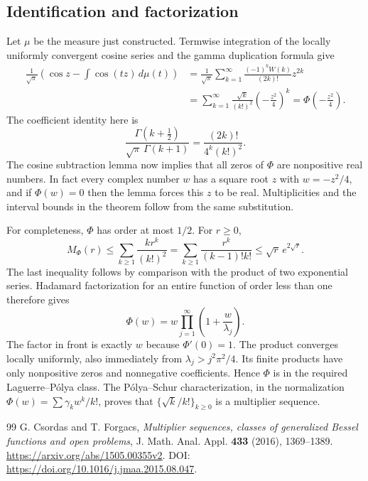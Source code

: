 \documentclass[11pt,a4paper]{article}
\theoremstyle{remark}
\begin{document}
\subsection{Identification and factorization}

Let $\mu$ be the measure just constructed.  Termwise integration of the
locally uniformly convergent cosine series and the gamma duplication
formula give
\begin{align*}
 \frac1{\sqrt\pi}
 \left(\cos z-\int\cos(tz)\,d\mu(t)\right)
 &=\frac1{\sqrt\pi}\sum_{k=1}^\infty
            \frac{(-1)^kW(k)}{(2k)!}z^{2k}\\
 &=\sum_{k=1}^\infty\frac{\sqrt{k}}{(k!)^2}
                         \left(-\frac{z^2}{4}\right)^k
 =\Phi\left(-\frac{z^2}{4}\right).
\end{align*}
The coefficient identity here is
\[
 \frac{\Gamma(k+\tfrac12)}{\sqrt\pi\,\Gamma(k+1)}
       =\frac{(2k)!}{4^k(k!)^2}.
\]
The cosine subtraction lemma now implies that all zeros of $\Phi$ are
nonpositive real numbers.  In fact every complex number $w$ has a
square root $z$ with $w=-z^2/4$, and if $\Phi(w)=0$ then the lemma
forces this $z$ to be real.  Multiplicities and the interval bounds in
the theorem follow from the same substitution.

For completeness, $\Phi$ has order at most $1/2$.  For $r\ge0$,
\[
 M_\Phi(r)\le\sum_{k\ge1}\frac{k r^k}{(k!)^2}
   =\sum_{k\ge1}\frac{r^k}{(k-1)!k!}
   \le\sqrt r\,e^{2\sqrt r}.
\]
The last inequality follows by comparison with the product of two
exponential series.  Hadamard factorization for an entire function of
order less than one therefore gives
\[
 \Phi(w)=w\prod_{j=1}^\infty\left(1+\frac{w}{\lambda_j}\right).
\]
The factor in front is exactly $w$ because $\Phi'(0)=1$.  The product
converges locally uniformly, also immediately from
$\lambda_j>j^2\pi^2/4$.  Its finite products have only nonpositive
zeros and nonnegative coefficients.  Hence $\Phi$ is in the required
Laguerre--P\'olya class.  The P\'olya--Schur characterization, in the
normalization $\Phi(w)=\sum\gamma_k w^k/k!$, proves that
$\{\sqrt{k}/k!\}_{k\ge0}$ is a multiplier sequence.

\begingroup\small
\begin{thebibliography}{99}
 G. Csordas and T. Forgacs, \emph{Multiplier sequences, classes of generalized Bessel functions and open problems}, J. Math. Anal. Appl. \textbf{433} (2016), 1369--1389. \url{https://arxiv.org/abs/1505.00355v2}. DOI: \url{https://doi.org/10.1016/j.jmaa.2015.08.047}.
\end{thebibliography}
\endgroup
\end{document}
